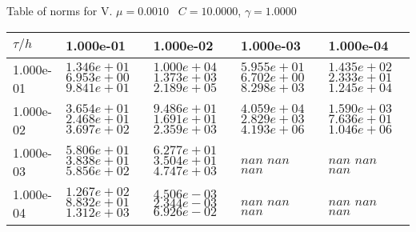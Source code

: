 \begin{center}
Table of norms for V. $\mu = 0.0010$ \, $C = 10.0000$, $\gamma = 1.0000$
  
\begin{tabular}{|p{1in}|p{1in}|p{1in}|p{1in}|p{1in}|} \hline
$\tau / h$ &1.000e-01 &1.000e-02 &1.000e-03 &1.000e-04 \\ \hline 
1.000e-01 & $1.346e+01$  $6.953e+00$  $9.841e+01$  & $1.000e+04$  $1.373e+03$  $2.189e+05$  & $5.955e+01$  $6.702e+00$  $8.298e+03$  & $1.435e+02$  $2.333e+01$  $1.245e+04$  \\ \hline 
1.000e-02 & $3.654e+01$  $2.468e+01$  $3.697e+02$  & $9.486e+01$  $1.691e+01$  $2.359e+03$  & $4.059e+04$  $2.829e+03$  $4.193e+06$  & $1.590e+03$  $7.636e+01$  $1.046e+06$  \\ \hline 
1.000e-03 & $5.806e+01$  $3.838e+01$  $5.856e+02$  & $6.277e+01$  $3.504e+01$  $4.747e+03$  & $nan$  $nan$  $nan$  & $nan$  $nan$  $nan$  \\ \hline 
1.000e-04 & $1.267e+02$  $8.832e+01$  $1.312e+03$  & $4.506e-03$  $2.344e-03$  $6.926e-02$  & $nan$  $nan$  $nan$  & $nan$  $nan$  $nan$  \\ \hline 

\end{tabular}\\[20pt]
\end{center}
